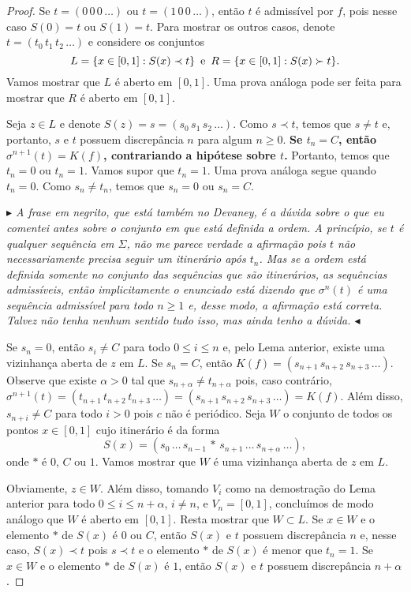 \begin{proof}
Se $t = (0\, 0\, 0\, \dots)$ ou $t = (1\, 0\, 0\, \dots)$, então $t$ é admissível por $f$, pois nesse caso $S(0) = t$ ou $S(1) = t$. Para mostrar os outros casos, denote $t = (t_0\, t_1\, t_2\, \dots)$ e considere os conjuntos 
$$L = \{ x \in [0, 1] : S(x) \prec t \} \text{\, e \,} R = \{ x \in [0, 1] : S(x) \succ t \}.$$
Vamos mostrar que $L$ é aberto em $[0, 1]$. Uma prova análoga pode ser feita para mostrar que $R$ é aberto em $[0, 1]$.

Seja $z \in L$ e denote $S(z) = s = (s_0 \, s_1 \, s_2 \, \dots)$. Como $s \prec t$, temos que $s \neq t$ e, portanto, $s$ e $t$ possuem discrepância $n$ para algum $n \geq 0$. \textbf{Se $t_n = C$, então $\sigma^{n+1}(t) = K(f)$, contrariando a hipótese sobre $t$.} Portanto, temos que $t_n = 0$ ou $t_n = 1$. Vamos supor que $t_n = 1$. Uma prova análoga segue quando $t_n = 0$. Como $s_n \neq t_n$, temos que $s_n = 0$ ou $s_n = C$. 

\textit{$\blacktriangleright$ A frase em negrito, que está também no Devaney, é a dúvida sobre o que eu comentei antes sobre o conjunto em que está definida a ordem. A princípio, se $t$ é qualquer sequência em $\Sigma$, não me parece verdade a afirmação pois $t$ não necessariamente precisa seguir um itinerário após $t_n$. Mas se a ordem está definida somente no conjunto das sequências que são itinerários, as sequências admissíveis, então implicitamente o enunciado está dizendo que $\sigma^n(t)$ é uma sequência admissível para todo $n \geq 1$ e, desse modo, a afirmação está correta. Talvez não tenha nenhum sentido tudo isso, mas ainda tenho a dúvida. $\blacktriangleleft$}

Se $s_n = 0$, então $s_i \neq C$ para todo $0 \leq i \leq n$ e, pelo Lema anterior, existe uma vizinhança aberta de $z$ em $L$. Se $s_n = C$, então $K(f) = (s_{n+1}\, s_{n+2}\, s_{n+3}\, \dots)$. Observe que existe $\alpha > 0$ tal que $s_{n+\alpha} \neq t_{n+\alpha}$ pois, caso contrário, $\sigma^{n+1}(t) = (t_{n+1}\, t_{n+2}\, t_{n+3}\, \dots) = (s_{n+1}\, s_{n+2}\, s_{n+3}\, \dots) = K(f)$. Além disso, $s_{n+i} \neq C$ para todo $i > 0$ pois $c$ não é periódico. Seja $W$ o conjunto de todos os pontos $x \in [0, 1]$ cujo itinerário é da forma
$$S(x) = (s_0\, \dots\, s_{n-1}\, *\, s_{n+1}\, \dots\, s_{n+\alpha}\, \dots),$$
onde $*$ é $0$, $C$ ou $1$. Vamos mostrar que $W$ é uma vizinhança aberta de $z$ em $L$.

Obviamente, $z \in W$. Além disso, tomando $V_i$ como na demostração do Lema anterior para todo $0 \leq i \leq n+\alpha$, $i \neq n$, e $V_n = [0, 1]$, concluímos de modo análogo que $W$ é aberto em $[0, 1]$. Resta mostrar que $W \subset L$. Se $x \in W$ e o elemento $*$ de $S(x)$ é $0$ ou $C$, então $S(x)$ e $t$ possuem discrepância $n$ e, nesse caso, $S(x) \prec t$ pois $s \prec t$ e o elemento $*$ de $S(x)$ é menor que $t_n = 1$. Se $x \in W$ e o elemento $*$ de $S(x)$ é $1$, então $S(x)$ e $t$ possuem discrepância $n+\alpha$.


\end{proof}
